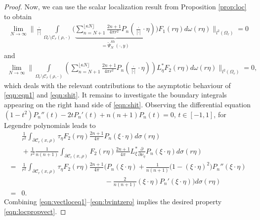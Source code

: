 \documentclass[a4paper, 10pt]{article}
\numberwithin{equation}{section}
\theoremstyle{definition}
\begin{document}
\begin{proof}
Now, we can use the scalar localization result from Proposition \ref{prop:loc} to obtain 
\begin{align}
\lim_{N\to\infty}\Bigg\|\frac{\cdot}{|\cdot|}\int\limits_{\Omega_r\setminus\mathcal{C}_r(\rho,\cdot)}\Bigg(\underbrace{\sum_{n=N+1}^{\lfloor\kappa N\rfloor}\frac{2n+1}{4\pi r^2}P_n\left(\frac{\cdot}{|\cdot|}\cdot\eta\right)}_{=\tilde{\Psi}_N^{Sh}(\cdot,y)}\Bigg)F_1(r\eta)d\omega(r\eta)\Bigg\|_{l^2(\Omega_r)}=0
\end{align}
and
\begin{align}
\lim_{N\to\infty}\Bigg\|\int\limits_{\Omega_r\setminus\mathcal{C}_r(\rho,\cdot)}\left(\sum_{n=N+1}^{\lfloor\kappa N\rfloor}\frac{2n+1}{4\pi r^2}P_n\left(\frac{\cdot}{|\cdot|}\cdot\eta\right) \right)L_{\eta}^*F_2(r\eta)d\omega(r\eta)\Bigg\|_{l^2(\Omega_r)}=0,
\end{align}
which deals with the relevant contributions to the asymptotic behaviour of \eqref{eqn:eqn1} and \eqref{eqn:shit}. It remains to investigate the boundary integrals appearing on the right hand side of \eqref{eqn:shit}. Observing the differential equation $(1-t^2)P_n''(t)-2tP_n'(t)+n(n+1)P_n(t)=0$, $t\in[-1,1]$, for Legendre polynomials leads to
\begin{align}\label{eqn:bvintzero}
&\!\!\!\!\!\!\frac{1}{r^2}\int_{\partial\mathcal{C}_r(x,\rho)}\tau_{\eta}F_2(r\eta)\frac{2n+1}{{4\pi}}P_{n}\left(\xi\cdot\eta\right)d\sigma(r\eta)
\\&\!\!\!\!\!\!+\frac{1}{r^2}\frac{1}{{ n(n+1)}}\int_{\partial\mathcal{C}_r(x,\rho)}F_2(r\eta)\frac{2n+1}{{4\pi}}L^*_{\xi}\frac{\partial}{\partial\nu_\eta}P_{n}\left(\xi\cdot\eta\right)d\sigma(r\eta)\nonumber
\\=&\frac{1}{r^2}\int_{\partial\mathcal{C}_r(x,\rho)}\tau_{\eta}F_2(r\eta)\frac{2n+1}{{4\pi}}\bigg(P_{n}(\xi\cdot\eta)+\frac{1}{ n(n+1)}\big(1-(\xi\cdot\eta)^2\big)P_{n}''(\xi\cdot\eta)\nonumber
\\&\qquad\qquad\qquad\qquad\qquad\qquad-\frac{2}{ n(n+1)}(\xi\cdot\eta)P_{n}'(\xi\cdot\eta)\bigg)d\sigma(r\eta)\nonumber
\\=&0.\nonumber
\end{align}
Combining \eqref{eqn:vectloceq1}--\eqref{eqn:bvintzero} implies the desired property \eqref{eqn:locpropvect}.
\end{proof}
\end{document}
